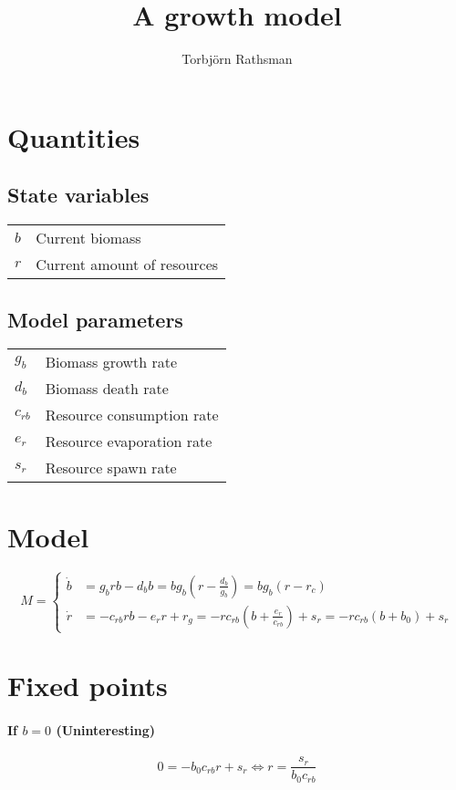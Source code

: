 \documentclass[a4paper, 12pt]{scrartcl}
\title{A growth model}
\author{Torbjörn Rathsman}
\begin{document}
\maketitle
\section{Quantities}
\subsection{State variables}
\begin{tabular}{ll}
$b$ & Current biomass \\
$r$ & Current amount of resources
\end{tabular}
\subsection{Model parameters}
\begin{tabular}{ll}
  $g_b$ & Biomass growth rate \\
 $d_b$ & Biomass death rate \\
 $c_{rb}$ & Resource consumption rate \\
 $e_r$ & Resource evaporation rate \\
 $s_r$ & Resource spawn rate \\
\end{tabular}

\section{Model}
\begin{equation}
M=
\left\{
 \begin{aligned}
  \dot{b} &= g_b rb - d_b b =  b g_b\left(r - \frac{d_b}{g_b}\right) = b g_b\left(r - r_c\right) \\
  \dot{r} &= -c_{rb} r b - e_r r + r_g = -rc_{rb}\left(b + \frac{e_r}{c_{rb}}\right) +s_r = -rc_{rb}\left(b + b_0\right) +s_r
 \end{aligned}
 \right.
\end{equation}

\section{Fixed points}
\paragraph{If $b = 0$ (Uninteresting)}
\[
 0 = -b_0c_{rb}r + s_r \Leftrightarrow r = \frac{s_r}{b_0 c_{rb}}
\]
\end{document}

